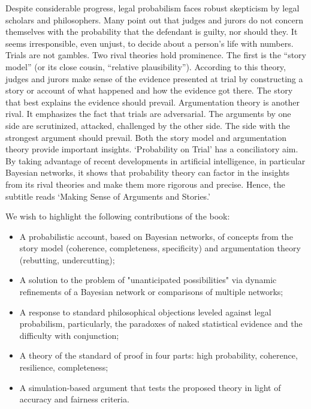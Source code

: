 \documentclass[
  10pt,
  dvipsnames,enabledeprecatedfontcommands]{scrartcl}
\begin{document}
Despite considerable progress, legal probabilism faces robust skepticism
by legal scholars and philosophers. Many point out that judges and
jurors do not concern themselves with the probability that the defendant
is guilty, nor should they. It seems irresponsible, even unjust, to
decide about a person's life with numbers. Trials are not gambles. Two
rival theories hold prominence. The first is the ``story model'' (or its
close cousin, ``relative plausibility''). According to this theory,
judges and jurors make sense of the evidence presented at trial by
constructing a story or account of what happened and how the evidence
got there. The story that best explains the evidence should prevail.
Argumentation theory is another rival. It emphasizes the fact that
trials are adversarial. The arguments by one side are scrutinized,
attacked, challenged by the other side. The side with the strongest
argument should prevail. Both the story model and argumentation theory
provide important insights. `Probability on Trial' has a conciliatory
aim. By taking advantage of recent developments in artificial
intelligence, in particular Bayesian networks, it shows that probability
theory can factor in the insights from its rival theories and make them
more rigorous and precise. Hence, the subtitle reads `Making Sense of
Arguments and Stories.'

We wish to highlight the following contributions of the book:

\begin{itemize}
\item A probabilistic account, based on Bayesian networks, of concepts from the story model (coherence, completeness, specificity) and argumentation theory (rebutting, undercutting);
\item A solution to the problem of "unanticipated possibilities" via dynamic refinements of a Bayesian network or comparisons of multiple networks;
\item A response to standard philosophical objections leveled against legal probabilism, particularly, the paradoxes of naked statistical evidence and the difficulty with conjunction; 
\item A theory of the standard of proof in four parts: high probability, coherence, resilience, completeness;
\item A simulation-based argument that tests the proposed theory in light of accuracy and fairness criteria.
\end{itemize}
\end{document}
